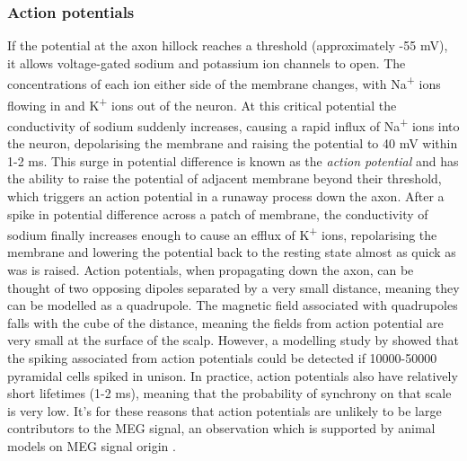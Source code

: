 \subsubsection{Action potentials}
If the potential at the axon hillock reaches a threshold (approximately -55 mV), it allows voltage-gated sodium and potassium ion channels to open. The concentrations of each ion either side of the membrane changes, with Na\textsuperscript{+} ions flowing in and K\textsuperscript{+} ions out of the neuron. At this critical potential the conductivity of sodium suddenly increases, causing a rapid influx of Na\textsuperscript{+} ions into the neuron, depolarising the membrane and raising the potential to 40 mV within 1-2 ms. This surge in potential difference is known as the \textit{action potential} and has the ability to raise the potential of adjacent membrane beyond their threshold, which triggers an action potential in a runaway process down the axon. After a spike in potential difference across a patch of membrane, the conductivity of sodium finally increases enough to cause an efflux of K\textsuperscript{+} ions, repolarising the membrane and lowering the potential back to the resting state almost as quick as was is raised. Action potentials, when propagating down the axon, can be thought of two opposing dipoles separated by a very small distance, meaning they can be modelled as a quadrupole. The magnetic field associated with quadrupoles falls with the cube of the distance, meaning the fields from action potential are very small at the surface of the scalp. However, a modelling study by \cite{Murakami2006} showed that the spiking associated from action potentials could be detected if 10000-50000 pyramidal cells spiked in unison. In practice, action potentials also have relatively short lifetimes (1-2 ms), meaning that the probability of synchrony on that scale is very low. It's for these reasons that action potentials are unlikely to be large contributors to the MEG signal, an observation which is supported by animal models on MEG signal origin \citep{Okada1997}.

